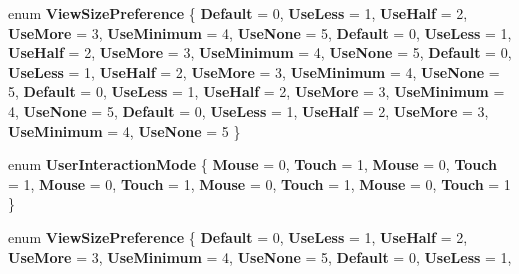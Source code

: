 \begin{DoxyCompactItemize}
enum {\bfseries View\+Size\+Preference} \{ \newline
{\bfseries Default} = 0, 
{\bfseries Use\+Less} = 1, 
{\bfseries Use\+Half} = 2, 
{\bfseries Use\+More} = 3, 
\newline
{\bfseries Use\+Minimum} = 4, 
{\bfseries Use\+None} = 5, 
{\bfseries Default} = 0, 
{\bfseries Use\+Less} = 1, 
\newline
{\bfseries Use\+Half} = 2, 
{\bfseries Use\+More} = 3, 
{\bfseries Use\+Minimum} = 4, 
{\bfseries Use\+None} = 5, 
\newline
{\bfseries Default} = 0, 
{\bfseries Use\+Less} = 1, 
{\bfseries Use\+Half} = 2, 
{\bfseries Use\+More} = 3, 
\newline
{\bfseries Use\+Minimum} = 4, 
{\bfseries Use\+None} = 5, 
{\bfseries Default} = 0, 
{\bfseries Use\+Less} = 1, 
\newline
{\bfseries Use\+Half} = 2, 
{\bfseries Use\+More} = 3, 
{\bfseries Use\+Minimum} = 4, 
{\bfseries Use\+None} = 5, 
\newline
{\bfseries Default} = 0, 
{\bfseries Use\+Less} = 1, 
{\bfseries Use\+Half} = 2, 
{\bfseries Use\+More} = 3, 
\newline
{\bfseries Use\+Minimum} = 4, 
{\bfseries Use\+None} = 5
 \}
\item 
\mbox{\label{namespace_windows_1_1_u_i_1_1_view_management_a164710c9a26d432f77ce83ece619738d}} 
enum {\bfseries User\+Interaction\+Mode} \{ \newline
{\bfseries Mouse} = 0, 
{\bfseries Touch} = 1, 
{\bfseries Mouse} = 0, 
{\bfseries Touch} = 1, 
\newline
{\bfseries Mouse} = 0, 
{\bfseries Touch} = 1, 
{\bfseries Mouse} = 0, 
{\bfseries Touch} = 1, 
\newline
{\bfseries Mouse} = 0, 
{\bfseries Touch} = 1
 \}
\item 
\mbox{\label{namespace_windows_1_1_u_i_1_1_view_management_aa4519c5469b746d5898bd904a05a819a}} 
enum {\bfseries View\+Size\+Preference} \{ \newline
{\bfseries Default} = 0, 
{\bfseries Use\+Less} = 1, 
{\bfseries Use\+Half} = 2, 
{\bfseries Use\+More} = 3, 
\newline
{\bfseries Use\+Minimum} = 4, 
{\bfseries Use\+None} = 5, 
{\bfseries Default} = 0, 
{\bfseries Use\+Less} = 1, 
\newline

\end{DoxyCompactItemize}
